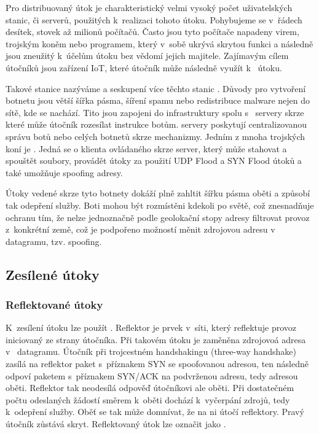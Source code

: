 Pro distribuovaný  útok je charakteristický velmi vysoký počet uživatelských stanic,
či serverů, použitých k~realizaci tohoto útoku. Pohybujeme se v~řádech desítek, stovek až
milionů počítačů. 
Často jsou tyto počítače napadeny virem, trojským koněm nebo programem, který v~sobě ukrývá
skrytou funkci a následně jsou zneužitý k~účelům  útoku bez vědomí jejich majitele.
Zajímavým cílem útočníků jsou zařízení IoT, které útočník může následně využít k~
útoku.

Takové stanice nazýváme  a seskupení více těchto stanic . Důvody pro
vytvoření botnetu jsou větší šířka pásma, šíření spamu nebo redistribuce malware nejen do sítě,
kde se  nachází. Tito  jsou zapojeni do  infrastruktury spolu
s~ servery skrze které může útočník rozesílat instrukce botům. %
 servery poskytují centralizovanou správu botů nebo celých botnetů skrze 
mechanizmy. Jedním z mnoha trojských koní je . Jedná se o klienta ovládaného 
skrze  server, který může stahovat a spouštět soubory, provádět  útoky
za použití UDP Flood a SYN Flood útoků a také umožňuje spoofing  adresy.

Útoky vedené skrze tyto botnety dokáží plně zahltit šířku pásma oběti a způsobí tak odepření
služby. 
Boti mohou být rozmístěni kdekoli po světě, což znesnadňuje ochranu tím, že nelze
jednoznačně podle geolokační stopy  adresy filtrovat provoz z~konkrétní země, což je
podpořeno možností měnit zdrojovou adresu v~ datagramu, tzv.  spoofing.

\subsection{Zesílené útoky}
\subsubsection{Reflektované útoky}
\label{subsec:reflektovane_utoky}
K~zesílení útoku lze použít . Reflektor je prvek v~síti, který reflektuje provoz
iniciovaný ze strany útočníka. Při takovém útoku je  zaměněna zdrojovoá adresa
v~ datagramu. Útočník při trojcestném handshakingu (three-way handshake) zasílá na
reflektor paket s~příznakem SYN se spoofovanou adresou, ten následně odpoví paketem
s~příznakem SYN/ACK na podvrženou  adresu, tedy adresou oběti. Reflektor tak
neodesílá odpověď útočníkovi ale oběti. Při dostatečném počtu odeslaných žádostí směrem k~oběti
dochází k~vyčerpání zdrojů, tedy k~odepření služby. Oběť se tak může domnívat, že na ni útočí
reflektory. Pravý útočník zůstává skryt. Reflektovaný útok lze označit jako .


